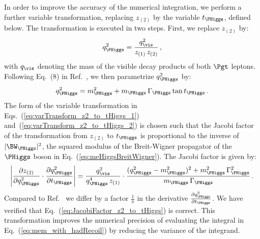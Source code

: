 In order to improve the accuracy of the numerical integration,
we perform a further variable transformation, replacing $z_{(2)}$ by the variable $t_{\PHiggs}$, defined below.
The transformation is executed in two steps. 
First, we replace $z_{(2)}$ by:
\begin{equation}
q_{\PHiggs}^{2} = \frac{q^{2}_{\vis}}{z_{(1)} \, z_{(2)}} \, ,
\label{eq:varTransform_z2_to_tHiggs_1}
\end{equation}
with $q_{\vis}$ denoting the mass of the visible decay products of both
$\Pgt$ leptons.
Following Eq.~(8) in Ref.~\cite{Alwall:2010cq}, we then parametrize $q_{\PHiggs}^{2}$ by:
\begin{equation}
q_{\PHiggs}^{2} = m_{\PHiggs}^{2} + m_{\PHiggs} \, \Gamma_{\PHiggs}
\tan t_{\PHiggs} \, .
\label{eq:varTransform_z2_to_tHiggs_2}
\end{equation}
The form of the variable transformation in Eqs.~(\ref{eq:varTransform_z2_to_tHiggs_1}) and~(\ref{eq:varTransform_z2_to_tHiggs_2}) 
is chosen such that the Jacobi factor of the transformation from
$z_{(2)}$ to $t_{\PHiggs}$ is proportional to the inverse of $\vert \BW_{\PHiggs} \vert^{2}$, 
the squared modulus of the Breit-Wigner propagator of the $\PHiggs$ boson in
Eq.~(\ref{eq:meHiggsBreitWigner}).
The Jacobi factor is given by:
\begin{equation}
\left\lvert \frac{\partial z_{(2)}}{\partial q_{\PHiggs}^{2}} \cdot \frac{\partial
  q_{\PHiggs}^{2}}{\partial t_{\PHiggs}} \right\rvert =
\frac{q^{2}_{\vis}}{q_{\PHiggs}^{4} \, z_{(1)}} \cdot \frac{(q_{\PHiggs}^{2}
  - m_{\PHiggs}^{2})^{2} + m_{\PHiggs}^{2} \,
  \Gamma_{\PHiggs}^{2}}{m_{\PHiggs} \, \Gamma_{\PHiggs}} \, .
\label{eq:JacobiFactor_z2_to_tHiggs}  
\end{equation}
Compared to Ref.~\cite{Alwall:2010cq} we differ by a factor $\frac{1}{\pi}$ in the derivative 
$\frac{\partial q_{\PHiggs}^{2}}{\partial t_{\PHiggs}}$. We have verified that Eq.~(\ref{eq:JacobiFactor_z2_to_tHiggs}) is correct.
This transformation improves the numerical precision of evaluating the integral 
in Eq.~(\ref{eq:mem_with_hadRecoil}) by reducing the variance of the integrand.


